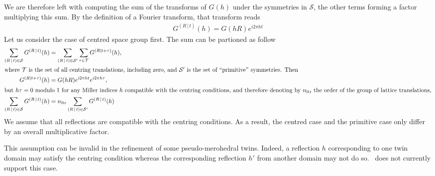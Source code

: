 \documentclass[pdf]{iucr}
\newcommand{\sym}[2]{\left( #1\,\vert\, #2 \right)}
\begin{document}
We are therefore left with computing the sum of the transforms of $G(h)$ under the symmetries in $\mathcal{S}$, the other terms forming a factor multiplying this sum. By the definition of a Fourier transform, that transform reads
\begin{align}
G^{\sym{R}{t}}(h) = G(hR)e^{i 2\pi ht}
\label{eqn:transformofG}
\end{align}
Let us consider the case of centred space group first. The sum can be partioned as follow
\begin{align}
 \sum_{\sym{R}{t} \in \mathcal{S}} G^{\sym{R}{t}}(h) &=  \sum_{\sym{R}{t} \in \mathcal{S}'} \sum_{\tau \in \cal{T}} G^{(R \mid t+\tau)}(h), \nonumber\\
\shortintertext{where $\cal{T}$ is the set of all centring translations, including zero, and $\mathcal{S}'$ is the set of ``primitive'' symmetries. Then}
G^{(R \mid t + \tau)}(h) &= G(hR) e^{i2\pi ht} e^{i2\pi h\tau}, \nonumber \\
\shortintertext{but $h\tau=0\ \text{modulo}\ 1$ for any Miller indices $h$ compatible with the centring conditions, and therefore denoting by $n_{\text{ltr}}$ the order of the group of lattice translations,}
\sum_{\sym{R}{t} \in \mathcal{S}} G^{\sym{R}{t}}(h) &= n_{\text{ltr}} \sum_{\sym{R}{t} \in \mathcal{S}'} G^{\sym{R}{t}}(h)
\end{align}
We assume that all reflections are compatible with the centring conditions. As a result,
the centred case and the primitive case only differ by an overall multiplicative factor.

This assumption can be invalid in the refinement of some pseudo-merohedral twins. Indeed, a reflection $h$ corresponding to one twin domain may satisfy the centring condition whereas the corresponding reflection $h'$ from another domain may not do so. \olexrefine\ does not currently support this case.   
\end{document}

